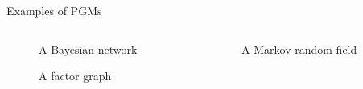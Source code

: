 \documentclass[10pt,usenames,dvipsnames]{beamer}
\begin{document}
\begin{frame}{Examples of PGMs}

  \begin{columns}

    \begin{column}{0.5\textwidth}

      \begin{figure}
        \scalebox{0.7}{}
        \caption{A Bayesian network}
      \end{figure}

      \begin{figure}
        \scalebox{0.7}{}
        \caption{A factor graph}
      \end{figure}

    \end{column}

    \begin{column}{0.5\textwidth}

      \begin{figure}
        \scalebox{0.7}{}
        \caption{A Markov random field}
      \end{figure}

    \end{column}

  \end{columns}

\end{frame}



\end{document}
